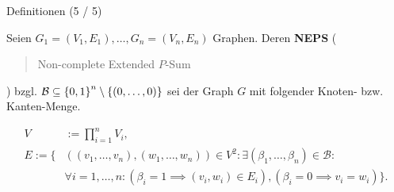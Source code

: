 \documentclass[aspectratio=169]{beamer}
\begin{document}
\begin{frame}{Definitionen (5 / 5)}

    \begin{definition*}[NEPS]

        Seien $G_1 = (V_1, E_1), \dots, G_n = (V_n, E_n)$ Graphen. Deren \textbf{NEPS} (\blockquote{Non-complete Extended $P$-Sum}) bzgl. $\mathcal B \subseteq {\left \{ 0, 1 \right \}}^n \setminus {\left \{ (0, \dots, 0) \right \}}$ sei der Graph $G$ mit folgender Knoten- bzw. Kanten-Menge.
    
        \begin{align*}
            V & := \prod_{i=1}^n V_i, \\
            E
            :=
            \{ &
                ((v_1, \dots, v_n), (w_1, \dots, w_n)) \in V^2:
                \exists (\beta_1, \dots, \beta_n) \in \mathcal B: \\ &
                    \forall i = 1, \dots, n:
                        (\beta_i = 1 \implies (v_i, w_i) \in E_i),
                        (\beta_i = 0 \implies v_i = w_i)
            \}.
        \end{align*}

    \end{definition*}
    

\end{frame}
\end{document}
